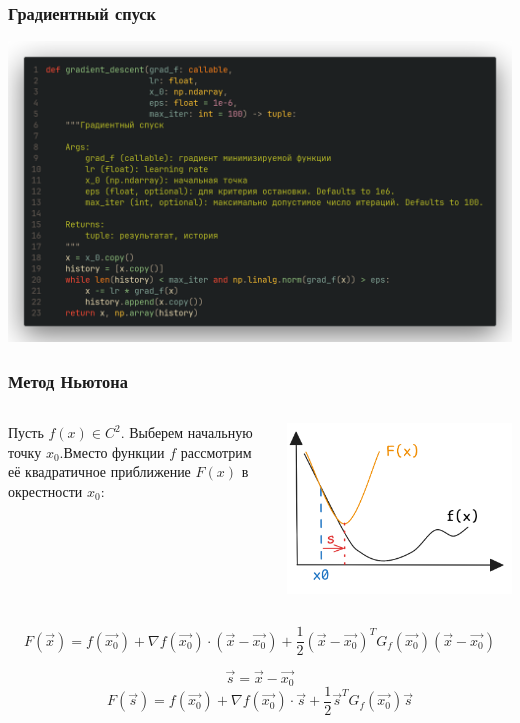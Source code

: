 \documentclass[9pt]{beamer}
\begin{document}
\begin{frame}
    \frametitle{Градиентный спуск}
    \begin{center}
        \includegraphics[width = 1\textwidth]{code_sgd.png}    
    \end{center}
    
\end{frame}


\begin{frame}
    \frametitle{Метод Ньютона}
    
\begin{columns}
    Пусть $f(x) \in C^{2}$. Выберем начальную точку $x_0$.Вместо функции $f$ рассмотрим её квадратичное приближение $F(x)$ в окрестности $x_0$:
    
   
    \includegraphics[width = 1\textwidth]{newton_expl.png}

    
\end{columns}
$$
F(\vec{x}) = f(\vec{x_0}) + \nabla f(\vec{x_0}) \cdot (\vec{x} - \vec{x_0}) + \frac{1}{2}(\vec{x} - \vec{x_0})^{T} G_{f}(\vec{x_0}) (\vec{x} - \vec{x_0})
$$

$$
\vec{s} = \vec{x} - \vec{x_0}
$$
$$
F(\vec{s}) = f(\vec{x_0}) + \nabla f(\vec{x_0}) \cdot \vec{s} + \frac{1}{2}\vec{s}^{T} G_{f}(\vec{x_0}) \vec{s}
$$
\end{frame}
\end{document}
